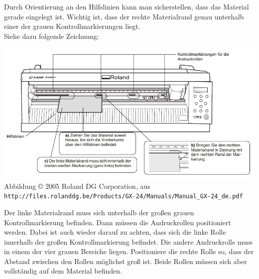 \documentclass{\basedir/fablab-document}
\newcommand{\RolandCopyrightHinweis}{Abbildung \copyright{} 2005 Roland DG Corporation, aus \texttt{\tiny http://files.rolanddg.be/Products/GX-24/Manuals/Manual\_GX-24\_de.pdf}}
\begin{document}
Durch Orientierung an den Hilfslinien kann man sicherstellen, dass das Material gerade eingelegt ist.
Wichtig ist, dass der rechte Materialrand genau unterhalb einer der grauen Kontrollmarkierungen liegt. \\
Siehe dazu folgende Zeichnung:
\begin{center}
 \includegraphics[width=\textwidth]{img/kontrollmarkierungen} \\
 \RolandCopyrightHinweis
\end{center}

Der linke Materialrand muss sich unterhalb der großen grauen Kontrollmarkierung befinden.
Dann müssen die Andruckrollen positioniert werden.
Dabei ist auch wieder darauf zu achten, dass sich  die linke Rolle innerhalb der großen Kontrollmarkierung befindet.
Die andere Andruckrolle muss in einem der vier grauen Bereiche liegen.
Positioniere die rechte Rolle so, dass der Abstand zwischen den Rollen möglichst groß ist.
Beide Rollen müssen sich aber vollständig auf dem Material befinden.  
\end{document}
